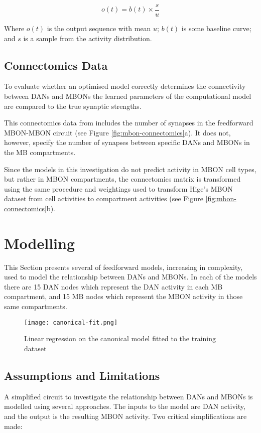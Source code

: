 \documentclass[11pt, A4]{article}
\begin{document}
\begin{multicols}{2}
\begin{equation}
o(t) = b(t) \times \frac{s}{u}
\end{equation}

Where $o(t)$ is the output sequence with mean $u$; $b(t)$ is some baseline curve; and $s$ is a sample from the activity distribution.


\subsection{Connectomics Data}

To evaluate whether an optimised model correctly determines the connectivity between DANs and MBONs the learned parameters of the computational model are compared to the true synaptic strengths. 

This connectomics data from  \cite{li2020connectome} includes the number of synapses in the feedforward MBON-MBON circuit (see Figure \ref{fig:mbon-connectomics}a). It does not, however, specify the number of synapses between specific DANs and MBONs in the MB compartments.

Since the models in this investigation do not predict activity in MBON cell types, but rather in MBON compartments, the connectomics matrix is transformed using the same procedure and weightings used to transform Hige's MBON dataset from cell activities to compartment activities (see Figure \ref{fig:mbon-connectomics}b).



		

\section{Modelling}
This Section presents several of feedforward models, increasing in complexity,  used to model the relationship between DANs and MBONs. In each of the models there are 15 DAN nodes which represent the DAN activity in each MB compartment, and 15 MB nodes which represent the MBON activity in those same compartments.


\begin{figure}[H]
	\centering
	\texttt{[image: canonical-fit.png]}
	\caption{Linear regression on the canonical model fitted to the training dataset}
	\label{fig:canonical-fit}
\end{figure}


\subsection{Assumptions and Limitations}
A simplified circuit to investigate the relationship between DANs and MBONs is modelled using several approaches. The inputs to the model are DAN activity, and the output is the resulting MBON activity. Two critical simplifications are made:


\end{multicols}
\end{document}
